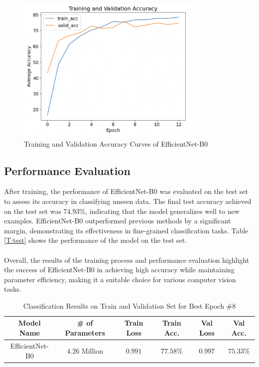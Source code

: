 \documentclass[12pt, a4paper, twoside]{article}
\begin{document}
			\begin{figure}[p]
				\centering
				\includegraphics[width=0.8\textwidth]{acc.png}
				\caption{Training and Validation Accuracy Curves of EfficientNet-B0}
				\label{F:acc}
			\end{figure}
		
		\subsection{Performance Evaluation}
			After training, the performance of EfficientNet-B0 was evaluated on the test set to assess its accuracy in classifying unseen data. The final test accuracy achieved on the test set was 74.93\%, indicating that the model generalizes well to new examples. EfficientNet-B0 outperformed previous methods by a significant margin, demonstrating its effectiveness in fine-grained classification tasks. Table \ref{T:test} shows the performance of the model on the test set.
			\\
			\\	
			Overall, the results of the training process and performance evaluation highlight the success of EfficientNet-B0 in achieving high accuracy while maintaining parameter efficiency, making it a suitable choice for various computer vision tasks.
			
			\begin{table}
				\begin{center}
					\begin{tabular}{c c c c c c}
						\hline
						\textbf{Model Name}& \textbf{\# of Parameters} & \textbf{Train Loss} & \textbf{Train Acc.} & \textbf{Val Loss} & \textbf{Val Acc.} \\ \hline
						EfficientNet-B0 & $4.26$ Million & $0.991$ & $77.58$\%  & $0.997$ & $75.33$\% \\ \hline
					\end{tabular}
					\caption{Classification Results on Train and Validation Set for Best Epoch \#8}\label{T:train}
				\end{center}
			\end{table}
			
\end{document}
